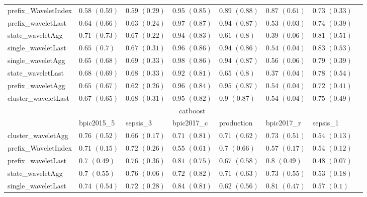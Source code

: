 \begin{table}[!htp]
{\begin{tabular}{llllllll}
			prefix\_WaveletIndex & $0.58$ ${(0.59)}$ & $0.59$ ${(0.29)}$ & $0.95$ ${(0.85)}$ & $0.89$ ${(0.88)}$ & $0.87$ ${(0.61)}$ & $0.73$ ${(0.33)}$ \\
			prefix\_waveletLast & $0.64$ ${(0.66)}$ & $0.63$ ${(0.24)}$ & $0.97$ ${(0.87)}$ & $0.94$ ${(0.87)}$ & $0.53$ ${(0.03)}$ & $0.74$ ${(0.39)}$ \\
			state\_waveletAgg & $0.71$ ${(0.73)}$ & $0.67$ ${(0.22)}$ & $0.94$ ${(0.83)}$ & $0.61$ ${(0.8)}$ & $0.39$ ${(0.06)}$ & $0.81$ ${(0.51)}$ \\
			single\_waveletLast & $0.65$ ${(0.7)}$ & $0.67$ ${(0.31)}$ & $0.96$ ${(0.86)}$ & $0.94$ ${(0.86)}$ & $0.54$ ${(0.04)}$ & $\mathbf{0.83}$ $\mathbf{(0.53)}$  \\
			single\_waveletAgg & $0.65$ ${(0.68)}$ & $\mathbf{0.69}$ $\mathbf{(0.33)}$  & $\mathbf{0.98}$ $\mathbf{(0.86)}$  & $0.94$ ${(0.87)}$ & $0.56$ ${(0.06)}$ & $0.79$ ${(0.39)}$ \\
			state\_waveletLast & $0.68$ ${(0.69)}$ & $0.68$ ${(0.33)}$ & $0.92$ ${(0.81)}$ & $0.65$ ${(0.8)}$ & $0.37$ ${(0.04)}$ & $0.78$ ${(0.54)}$ \\
			prefix\_waveletAgg & $0.65$ ${(0.67)}$ & $0.62$ ${(0.26)}$ & $0.96$ ${(0.84)}$ & $\mathbf{0.95}$ $\mathbf{(0.87)}$  & $0.54$ ${(0.04)}$ & $0.72$ ${(0.41)}$ \\
			cluster\_waveletLast & $0.67$ ${(0.65)}$ & $0.68$ ${(0.31)}$ & $0.95$ ${(0.82)}$ & $0.9$ ${(0.87)}$ & $0.54$ ${(0.04)}$ & $0.75$ ${(0.49)}$ \\
			\bottomrule
			\toprule
			& \multicolumn{5}{c}{catboost}
			\\
			& bpic2015\_5 & sepsis\_3 & bpic2017\_c & production & bpic2017\_r & sepsis\_1
			\\ \midrule
			cluster\_waveletAgg & $\mathbf{0.76}$ $\mathbf{(0.52)}$  & $0.66$ ${(0.17)}$ & $0.71$ ${(0.81)}$ & $0.71$ ${(0.62)}$ & $0.73$ ${(0.51)}$ & $0.54$ ${(0.13)}$ \\
			prefix\_WaveletIndex & $0.71$ ${(0.15)}$ & $0.72$ ${(0.26)}$ & $0.55$ ${(0.61)}$ & $0.7$ ${(0.66)}$ & $0.57$ ${(0.17)}$ & $0.54$ ${(0.12)}$ \\
			prefix\_waveletLast & $0.7$ ${(0.49)}$ & $0.76$ ${(0.36)}$ & $0.81$ ${(0.75)}$ & $0.67$ ${(0.58)}$ & $0.8$ ${(0.49)}$ & $0.48$ ${(0.07)}$ \\
			state\_waveletAgg & $0.7$ ${(0.55)}$ & $0.76$ ${(0.06)}$ & $0.72$ ${(0.82)}$ & $0.71$ ${(0.63)}$ & $0.73$ ${(0.55)}$ & $0.53$ ${(0.18)}$ \\
			single\_waveletLast & $0.74$ ${(0.54)}$ & $0.72$ ${(0.28)}$ & $\mathbf{0.84}$ $\mathbf{(0.81)}$  & $0.62$ ${(0.56)}$ & $0.81$ ${(0.47)}$ & $0.57$ ${(0.1)}$ \\

\end{tabular}}
\end{table}
